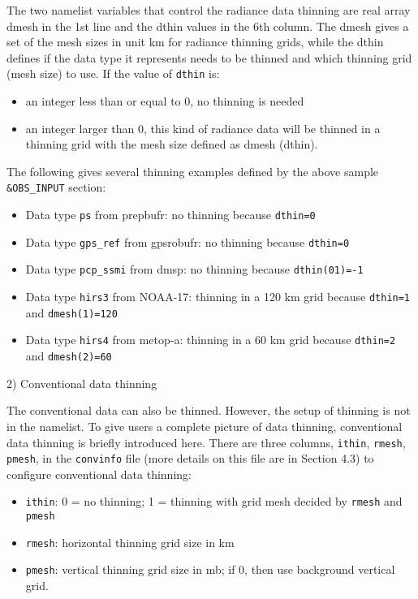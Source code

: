 The two namelist variables that control the radiance data thinning are real array dmesh in the 1st line and the dthin values in the 6th column. The dmesh gives a set of the mesh sizes in unit km for radiance thinning grids, while the dthin defines if the data type it represents needs to be thinned and which thinning grid (mesh size) to use. If the value of \verb|dthin| is:

\begin{itemize}
\item an integer less than or equal to 0,  no thinning is needed
\item an integer larger than 0, this kind of radiance data will be thinned in a thinning grid with the mesh size defined as dmesh (dthin). 
\end{itemize}

The following gives several thinning examples defined by the above sample \verb| &OBS_INPUT| section:
\begin{itemize}
\item Data type \verb|ps| from prepbufr: no thinning because \verb|dthin=0|
\item Data type \verb|gps_ref| from gpsrobufr: no thinning because \verb|dthin=0|
\item Data type \verb|pcp_ssmi| from dmsp: no thinning because \verb|dthin(01)=-1|
\item Data type \verb|hirs3| from NOAA-17: thinning in a 120 km grid because \verb|dthin=1| and \verb|dmesh(1)=120|
\item Data type \verb|hirs4| from metop-a: thinning in a 60 km grid because \verb|dthin=2| and \verb|dmesh(2)=60|
\end{itemize}

2) Conventional data thinning

The conventional data can also be thinned. However, the setup of thinning is not in the namelist. To give users a complete picture of data thinning, conventional data thinning is briefly introduced here. There are three columns, \verb|ithin|, \verb|rmesh|, \verb|pmesh|, in the \verb|convinfo| file (more details on this file are in Section 4.3) to configure conventional data thinning:

\begin{itemize}
\item \verb|ithin|: 0 = no thinning; 
             1 = thinning with grid mesh decided by \verb|rmesh| and \verb|pmesh|
\item \verb|rmesh|: horizontal thinning grid size in km
\item \verb|pmesh|: vertical thinning grid size in mb; if 0, then use background vertical grid.
\end{itemize}

